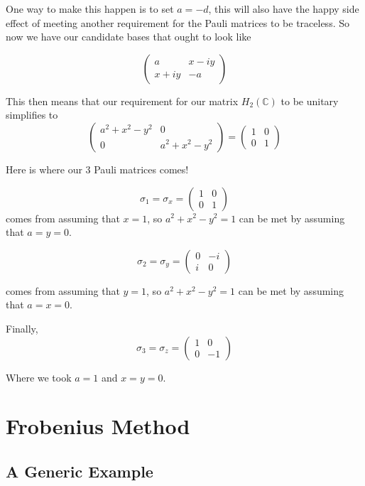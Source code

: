 One way to make this happen is to set $a = -d$, this will also have the happy side effect of meeting another requirement
for the Pauli matrices to be traceless.
So now we have our candidate bases that ought to look like

$$
\begin{pmatrix}
a      & x - iy \\
x + iy & -a
\end{pmatrix}
$$

This then means that our requirement for our matrix $H_2 (\mathbb{C})$ to be unitary simplifies to
$$
\begin{pmatrix}
a^2 + x^2 - y^2 & 0                \\
0               & a^2 + x^2 - y^2
\end{pmatrix}
=
\begin{pmatrix}
1 & 0 \\
0 & 1
\end{pmatrix}
$$

Here is where our 3 Pauli matrices comes!

$$
\sigma_1 = \sigma_x =  
\begin{pmatrix}
1 & 0 \\
0 & 1
\end{pmatrix}
$$
comes from assuming that $x=1$, so $a^2 + x^2 - y^2 = 1$ can be met by assuming that $a = y = 0$.

$$
\sigma_2 = \sigma_y =  
\begin{pmatrix}
0 & -i \\
i & 0
\end{pmatrix}
$$

comes from assuming that $y=1$, so $a^2 + x^2 - y^2 = 1$ can be met by assuming that $a = x = 0$.

Finally,
$$
\sigma_3 = \sigma_z =  
\begin{pmatrix}
1 & 0 \\
0 & -1
\end{pmatrix}
$$

Where we took $a=1$ and $x = y = 0$.





\section{Frobenius Method}

\subsection{A Generic Example}


